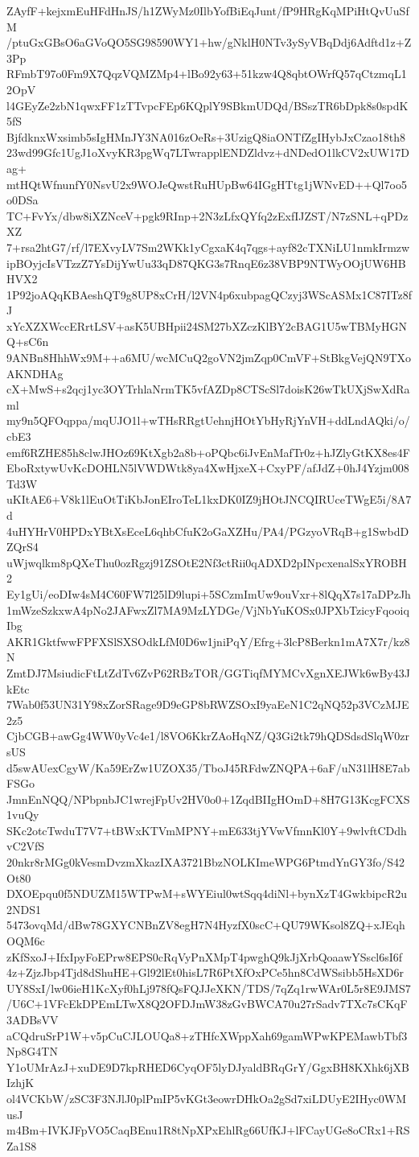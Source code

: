 ZAyfF+kejxmEuHFdHnJS/h1ZWyMz0IlbYofBiEqJunt/fP9HRgKqMPiHtQvUuSfM
/ptuGxGBsO6aGVoQO5SG98590WY1+hw/gNklH0NTv3ySyVBqDdj6Adftd1z+Z3Pp
RFmbT97o0Fm9X7QqzVQMZMp4+lBo92y63+51kzw4Q8qbtOWrfQ57qCtzmqL12OpV
l4GEyZe2zbN1qwxFF1zTTvpcFEp6KQplY9SBkmUDQd/BSszTR6bDpk8s0spdK5fS
BjfdknxWxsimb5sIgHMnJY3NA016zOeRs+3UzigQ8iaONTfZgIHybJxCzao18th8
23wd99Gfc1UgJ1oXvyKR3pgWq7LTwrapplENDZldvz+dNDedO1lkCV2xUW17Dag+
mtHQtWfnunfY0NsvU2x9WOJeQwstRuHUpBw64IGgHTtg1jWNvED++Ql7oo5o0DSa
TC+FvYx/dbw8iXZNceV+pgk9RInp+2N3zLfxQYfq2zExfIJZST/N7zSNL+qPDzXZ
7+rsa2htG7/rf/l7EXvyLV7Sm2WKk1yCgxaK4q7qgs+ayf82cTXNiLU1nmkIrmzw
ipBOyjcIsVTzzZ7YsDijYwUu33qD87QKG3s7RnqE6z38VBP9NTWyOOjUW6HBHVX2
1P92joAQqKBAeshQT9g8UP8xCrH/l2VN4p6xubpagQCzyj3WScASMx1C87ITz8fJ
xYcXZXWccERrtLSV+asK5UBHpii24SM27bXZczKlBY2cBAG1U5wTBMyHGNQ+sC6n
9ANBn8HhhWx9M++a6MU/wcMCuQ2goVN2jmZqp0CmVF+StBkgVejQN9TXoAKNDHAg
cX+MwS+s2qcj1yc3OYTrhlaNrmTK5vfAZDp8CTScSl7doisK26wTkUXjSwXdRaml
my9n5QFOqppa/mqUJO1l+wTHsRRgtUehnjHOtYbHyRjYnVH+ddLndAQki/o/cbE3
emf6RZHE85h8clwJHOz69KtXgb2a8b+oPQbc6iJvEnMafTr0z+hJZlyGtKX8es4F
EboRxtywUvKcDOHLN5lVWDWtk8ya4XwHjxeX+CxyPF/afJdZ+0hJ4Yzjm008Td3W
uKItAE6+V8k1lEuOtTiKbJonEIroTeL1kxDK0IZ9jHOtJNCQIRUceTWgE5i/8A7d
4uHYHrV0HPDxYBtXsEceL6qhbCfuK2oGaXZHu/PA4/PGzyoVRqB+g1SwbdDZQrS4
uWjwqlkm8pQXeThu0ozRgzj91ZSOtE2Nf3ctRii0qADXD2pINpcxenalSxYROBH2
Ey1gUi/eoDIw4sM4C60FW7l25lD9lupi+5SCzmImUw9ouVxr+8lQqX7s17aDPzJh
1mWzeSzkxwA4pNo2JAFwxZl7MA9MzLYDGe/VjNbYuKOSx0JPXbTzicyFqooiqIbg
AKR1GktfwwFPFXSlSXSOdkLfM0D6w1jniPqY/Efrg+3lcP8Berkn1mA7X7r/kz8N
ZmtDJ7MsiudicFtLtZdTv6ZvP62RBzTOR/GGTiqfMYMCvXgnXEJWk6wBy43JkEtc
7Wab0f53UN31Y98xZorSRage9D9eGP8bRWZSOxI9yaEeN1C2qNQ52p3VCzMJE2z5
CjbCGB+awGg4WW0yVc4e1/l8VO6KkrZAoHqNZ/Q3Gi2tk79hQDSdsdSlqW0zrsUS
d5swAUexCgyW/Ka59ErZw1UZOX35/TboJ45RFdwZNQPA+6aF/uN31lH8E7abFSGo
JmnEnNQQ/NPbpnbJC1wrejFpUv2HV0o0+1ZqdBIIgHOmD+8H7G13KcgFCXS1vuQy
SKc2otcTwduT7V7+tBWxKTVmMPNY+mE633tjYVwVfmnKl0Y+9wlvftCDdhvC2VfS
20nkr8rMGg0kVesmDvzmXkazIXA3721BbzNOLKImeWPG6PtmdYnGY3fo/S42Ot80
DXOEpqu0f5NDUZM15WTPwM+sWYEiul0wtSqq4diNl+bynXzT4GwkbipcR2u2NDS1
5473ovqMd/dBw78GXYCNBnZV8egH7N4HyzfX0scC+QU79WKsol8ZQ+xJEqhOQM6c
zKfSxoJ+IfxIpyFoEPrw8EPS0cRqVyPnXMpT4pwghQ9kJjXrbQoaawYSscl6sI6f
4z+ZjzJbp4Tjd8dShuHE+Gl92lEt0hisL7R6PtXfOxPCe5hn8CdWSsibb5HsXD6r
UY8SxI/lw06ieH1KcXyf0hLj978fQsFQJJeXKN/TDS/7qZq1rwWAr0L5r8E9JMS7
/U6C+1VFcEkDPEmLTwX8Q2OFDJmW38zGvBWCA70u27rSadv7TXc7sCKqF3ADBsVV
aCQdruSrP1W+v5pCuCJLOUQa8+zTHfcXWppXah69gamWPwKPEMawbTbf3Np8G4TN
Y1oUMrAzJ+xuDE9D7kpRHED6CyqOF5lyDJyaldBRqGrY/GgxBH8KXhk6jXBIzhjK
ol4VCKbW/zSC3F3NJlJ0plPmIP5vKGt3eowrDHkOa2gSd7xiLDUyE2IHyc0WMusJ
m4Bm+IVKJFpVO5CaqBEnu1R8tNpXPxEhlRg66UfKJ+lFCayUGe8oCRx1+RSZa1S8
